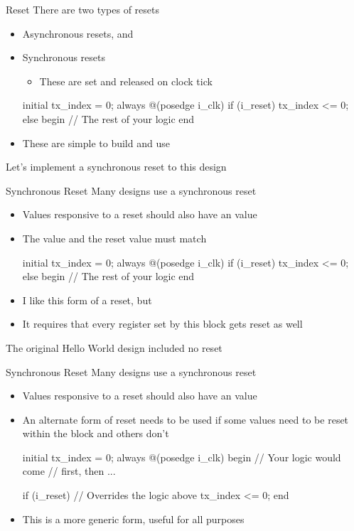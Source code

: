 \documentclass[style=gt,mode=present,paper=screen]{powerdot}
\begin{document}
%
%
\begin{slide}[toc=,bm=,method=direct]{Reset}
There are two types of resets
\begin{itemize}
\item Asynchronous resets, and
\item Synchronous resets
	\begin{itemize}
	\item These are set and released on clock tick
	\end{itemize}
\begin{zformal}
initial tx_index = 0;
always @(posedge i_clk)
if (i_reset)
	tx_index <= 0;
else begin
	// The rest of your logic
end
\end{zformal}
\item These are simple to build and use
\end{itemize}
Let's implement a synchronous reset to this design
\end{slide}
%
%
\begin{slide}[toc=,bm=,method=direct]{Synchronous Reset}
Many designs use a synchronous reset
\begin{itemize}
\item Values responsive to a reset should also have an  value
\item The  value and the reset value must match
\begin{zformal}
initial tx_index = 0;
always @(posedge i_clk)
if (i_reset)
	tx_index <= 0;
else begin
	// The rest of your logic
end
\end{zformal}
\item I like this form of a reset, but
\item It requires that every register set by this block gets reset as well
\end{itemize}
The original Hello World design included no reset
\end{slide}
%
%
\begin{slide}[toc=,bm=,method=direct]{Synchronous Reset}
Many designs use a synchronous reset
\begin{itemize}
\item Values responsive to a reset should also have an  value
\item An alternate form of reset needs to be used if some values need to be
	reset within the block and others don't
\begin{zformal}
initial tx_index = 0;
always @(posedge i_clk)
begin
	// Your logic would come
	// first, then ...

	if (i_reset)
		// Overrides the logic above
		tx_index <= 0;
end
\end{zformal}
\item This is a more generic form, useful for all purposes
\end{itemize}
\end{slide}
\end{document}
